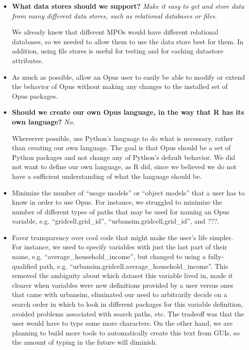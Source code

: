 \begin{itemize}
  \item {\bf What data stores should we support?} \emph{Make it easy to get and
  store data from many different data stores, such as relational databases or
  files.}

  We already knew that different MPOs would have different relational
  databases, so we needed to allow them to use the data store best for them. In
  addition, using file stores is useful for testing and for caching datastore
  attributes.

  \item As much as possible, allow an Opus user to easily be able to modify or
  extend the behavior of Opus without making any changes to the installed set
  of Opus packages.

  \item {\bf Should we create our own Opus language, in the way that R \rindex has its
  own language?} \emph{No.}

  Whereever possible, use Python's \pythonindex language to do what is necessary, rather
  than creating our own language.  The goal is that Opus should be a set of
  Python \pythonindex packages and not change any of Python's \pythonindex default behavior.  We did not
  want to define our own language, as R \rindex did, since we believed we do not have a
  sufficient understanding of what the language should be.

  \item Minimize the number of ``usage models'' or ``object models'' that a user
  has to know in order to use Opus.  For instance, we struggled to minimize the
  number of different types of paths that may be used for naming an Opus
  variable, e.g. ``gridcell.grid_id'', ``urbansim.gridcell.grid_id'', and ???.

  \item Favor transparency over cool code that might make the user's life
  simpler.  For instance, we used to specify variables \variablesindex with just the last part
  of their name, e.g. ``average_household_income'', but changed to using a
  fully-qualified path, e.g.
  ``urbansim.gridcell.average_household_income''. This removed the
  ambiguity about which dataset \datasetindex this variable \variablesindex lived in, made it clearer when
  variables \variablesindex were new definitions provided by a user versus ones that came with
  urbansim, eliminated our need to arbitrarily decide on a search order in
  which to look in different packages for this variable definition, avoided
  problems associated with search paths, etc.  The tradeoff was that the user
  would have to type some more characters.  On the other hand, we are planning
  to build more tools to automatically create this text from GUIs, so the
  amount of typing in the future will diminish.


\end{itemize}
